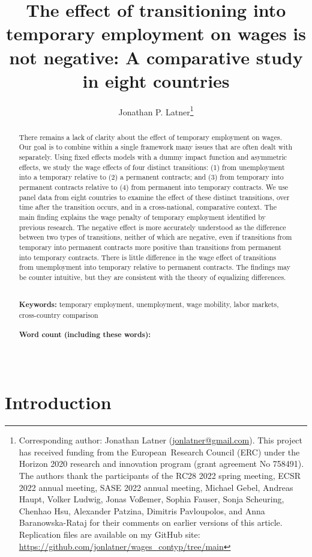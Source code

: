 \documentclass[12pt]{article}
\title{The effect of transitioning into temporary employment on wages is not negative: A comparative study in eight countries}
\author{Jonathan P. Latner\thanks{Corresponding author: Jonathan Latner (\url{jonlatner@gmail.com}).  This project has received funding from the European\ Research Council (ERC) under the Horizon 2020 research and innovation program (grant agreement No 758491).  The authors thank the participants of the RC28 2022 spring meeting, ECSR 2022 annual meeting, SASE 2022 annual meeting, Michael Gebel, Andreas Haupt, Volker Ludwig, Jonas Voßemer, Sophia Fauser, Sonja Scheuring, Chenhao Hsu, Alexander Patzina, Dimitris Pavloupolos, and Anna Baranowska-Rataj for their comments on earlier versions of this article.  Replication files are available on my GitHub site: \url{https://github.com/jonlatner/wages_contyp/tree/main}}}
\date{\vspace{-5ex}}
\newcommand\wordcount{}
\begin{document}
\maketitle

\begin{abstract}

\noindent 
There remains a lack of clarity about the effect of temporary employment on wages.  Our goal is to combine within a single framework many issues that are often dealt with separately.  Using fixed effects models with a dummy impact function and asymmetric effects, we study the wage effects of four distinct transitions: (1) from unemployment into a temporary relative to (2) a permanent contracts; and (3) from temporary into permanent contracts relative to (4) from permanent into temporary contracts.  We use panel data from eight countries to examine the effect of these distinct transitions, over time after the transition occurs, and in a cross-national, comparative context.  The main finding explains the wage penalty of temporary employment identified by previous research.  The negative effect is more accurately understood as the difference between two types of transitions, neither of which are negative, even if transitions from temporary into permanent contracts more positive than transitions from permanent into temporary contracts.  There is little difference in the wage effect of transitions from unemployment into temporary relative to permanent contracts. The findings may be counter intuitive, but they are consistent with the theory of equalizing differences.  

\noindent
\\
{\bf Keywords:} temporary employment, unemployment, wage mobility, labor markets, cross-country comparison \\
\\
{\bf Word count (including these words):} \wordcount

\noindent
\\

\end{abstract}

\doublespacing
\clearpage
\section{Introduction}
\end{document}
